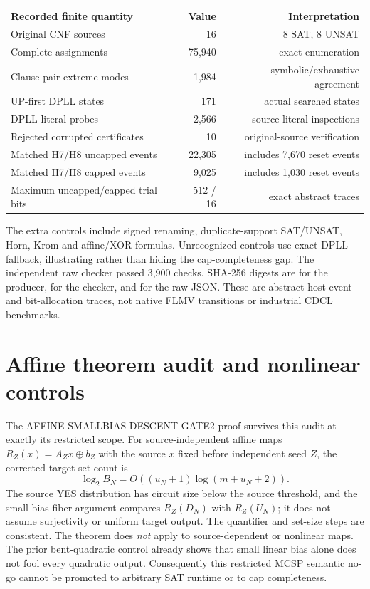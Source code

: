 \documentclass[11pt]{article}
\begin{document}
\begin{center}\small
\begin{tabular}{lrr}
\toprule
Recorded finite quantity & Value & Interpretation\\\midrule
Original CNF sources & 16 & 8 SAT, 8 UNSAT\\
Complete assignments & 75,940 & exact enumeration\\
Clause-pair extreme modes & 1,984 & symbolic/exhaustive agreement\\
UP-first DPLL states & 171 & actual searched states\\
DPLL literal probes & 2,566 & source-literal inspections\\
Rejected corrupted certificates & 10 & original-source verification\\
Matched H7/H8 uncapped events & 22,305 & includes 7,670 reset events\\
Matched H7/H8 capped events & 9,025 & includes 1,030 reset events\\
Maximum uncapped/capped trial bits & 512 / 16 & exact abstract traces\\\bottomrule
\end{tabular}
\end{center}

The extra controls include signed renaming, duplicate-support SAT/UNSAT,
Horn, Krom and affine/XOR formulas.  Unrecognized controls use exact DPLL
fallback, illustrating rather than hiding the cap-completeness gap.  The
independent raw checker passed 3,900 checks.  SHA-256 digests are
for the producer,
for the checker, and
for the raw JSON.  These are abstract host-event and bit-allocation traces,
not native FLMV transitions or industrial CDCL benchmarks.

\section{Affine theorem audit and nonlinear controls}
The AFFINE-SMALLBIAS-DESCENT-GATE2 proof survives this audit at exactly its
restricted scope.  For source-independent affine maps $R_Z(x)=A_Zx\oplus b_Z$
with the source $x$ fixed before independent seed $Z$, the corrected target-set
count is
\[
 \log_2 B_N=O((u_N+1)\log(m+u_N+2)).
\]
The source YES distribution has circuit size below the source threshold, and
the small-bias fiber argument compares $R_Z(D_N)$ with $R_Z(U_N)$; it does not
assume surjectivity or uniform target output.  The quantifier and set-size
steps are consistent.  The theorem does \emph{not} apply to source-dependent
or nonlinear maps.  The prior bent-quadratic control already shows that small
linear bias alone does not fool every quadratic output.  Consequently this
restricted MCSP semantic no-go cannot be promoted to arbitrary SAT runtime or
to cap completeness.
\end{document}
